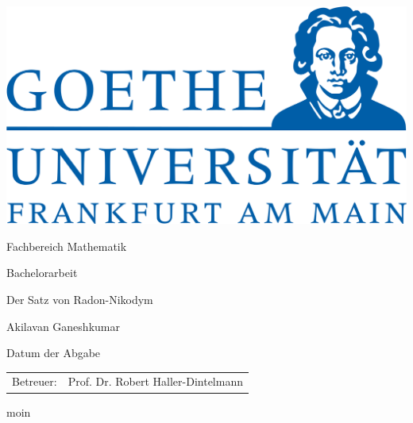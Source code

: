 \documentclass[a4paper]{article}
\author{Deniz Güven}
\begin{document}
\begin{titlepage}
  \begin{center}
    \includegraphics[width=0.5\linewidth]{res/uni.png}
    \vfill

    \large{Fachbereich Mathematik}
    \vfill

    \large{Bachelorarbeit}
    \vfill

    \huge{Der Satz von Radon-Nikodym}
    \vfill

        \large
    Akilavan Ganeshkumar
    \vfill

    Datum der Abgabe
    \vfill
\begin{tabular}{rl}
    Betreuer:& Prof. Dr. Robert Haller-Dintelmann
\end{tabular}
  \end{center}
\end{titlepage}

moin
\end{document}
